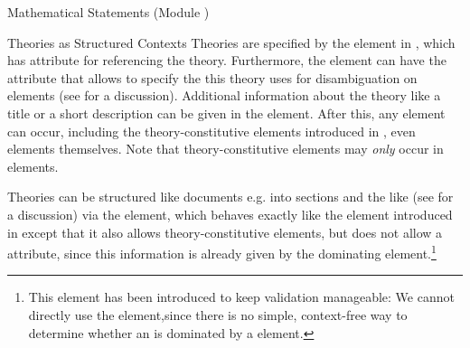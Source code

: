 \begin{tchapter}[id=statements,short=Mathematical Statements]{Mathematical Statements (Module {})}
\begin{tsection}[id=theories]{Theories as Structured Contexts}
  Theories are specified by the {} element in {\omdoc}, which has
  {}
  {} attribute for referencing the theory. Furthermore,
  the {} element can have the {}
  attribute that allows to specify the {} this theory uses for
  disambiguation on {} elements (see {} for a
  discussion).  Additional information about the theory like a title or a short
  description can be given in the {} element. After this, any
  {} {\omdoc} element can occur, including the theory-constitutive
  elements introduced in {}, even
  {} elements themselves. Note that theory-constitutive elements may
  {\emph{only}} occur in {} elements.

  Theories can be structured like documents e.g. into sections and the like (see
  {} for a discussion) via the {} element, which
  behaves exactly like the {} element introduced in
  {} except that it also allows theory-constitutive elements, but
  does not allow a {} attribute, since this information is
  already given by the dominating {} element.\footnote{This element has
    been introduced to keep {\omdoc} validation manageable: We cannot directly use the
    {} element,since there is no simple, context-free way to determine
    whether an {} is dominated by a {} element.}
  

\end{tsection}
\end{tchapter}
